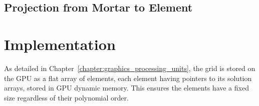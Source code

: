 \subsection{Projection from Mortar to Element} \label{section:adaptive_mesh_refinement:mortar_element_method:mortar_to_element}


\section{Implementation} \label{section:adaptive_mesh_refinement:implementation}

As detailed in Chapter~\ref{chapter:graphics_processing_units}, the grid is stored on the GPU as a
flat array of elements, each element having pointers to its solution arrays, stored in GPU dynamic
memory. This ensures the elements have a fixed size regardless of their polynomial order.